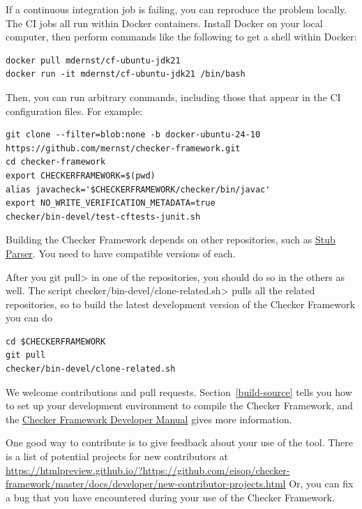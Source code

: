 If a continuous integration job is failing, you can reproduce the problem locally.
The CI jobs all run within Docker containers.
Install Docker on your local computer, then perform commands like the
following to get a shell within Docker:

\begin{Verbatim}
docker pull mdernst/cf-ubuntu-jdk21
docker run -it mdernst/cf-ubuntu-jdk21 /bin/bash
\end{Verbatim}

Then, you can run arbitrary commands, including those that appear in the
CI configuration files.  For example:

\begin{Verbatim}
git clone --filter=blob:none -b docker-ubuntu-24-10 https://github.com/mernst/checker-framework.git
cd checker-framework
export CHECKERFRAMEWORK=$(pwd)
alias javacheck='$CHECKERFRAMEWORK/checker/bin/javac'
export NO_WRITE_VERIFICATION_METADATA=true
checker/bin-devel/test-cftests-junit.sh
\end{Verbatim}



Building the Checker Framework depends on other repositories, such as
\href{https://github.com/eisop/stubparser/}{Stub Parser}.
You need to have compatible versions of each.

After you \<git pull> in one of the repositories, you should do so in the
others as well.  The script \<checker/bin-devel/clone-related.sh> pulls all the
related repositories, so to build the latest development version of the
Checker Framework you can do

\begin{Verbatim}
cd $CHECKERFRAMEWORK
git pull
checker/bin-devel/clone-related.sh
\end{Verbatim}



We welcome contributions and pull requests.  Section~\ref{build-source}
tells you how to set up your development environment to compile the Checker
Framework, and the
\href{https://htmlpreview.github.io/?https://github.com/eisop/checker-framework/master/docs/developer/developer-manual.html}{Checker
  Framework Developer Manual} gives more information.

One good way to contribute is to give feedback about your use of the tool.
There is a list
of potential projects for new contributors at
\url{https://htmlpreview.github.io/?https://github.com/eisop/checker-framework/master/docs/developer/new-contributor-projects.html}
Or, you can fix a bug that
you have encountered during your use of the Checker Framework.


